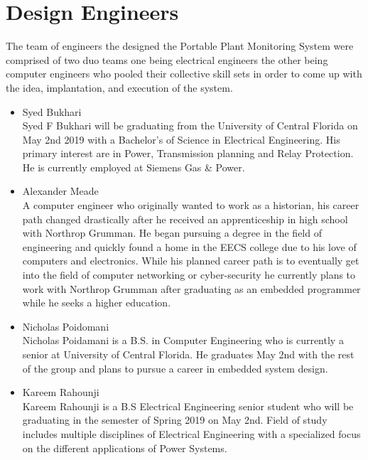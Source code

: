 \documentclass[comsoc, 12pt]{IEEEtran}
\begin{document}
\section{Design Engineers}
The team of engineers the designed the Portable Plant Monitoring System were comprised of two duo teams one being electrical engineers the other being computer engineers who pooled their collective skill sets in order to come up with the idea, implantation, and execution of the system. 
\begin{itemize}
    \item Syed Bukhari \\
    Syed F Bukhari will be graduating from the University of Central Florida on May 2nd 2019 with a Bachelor’s of Science in Electrical Engineering. His primary interest are in Power, Transmission planning and Relay Protection. He is currently employed at Siemens Gas & Power.
    \item Alexander Meade \\
    A computer engineer who originally wanted to work as a historian, his career path changed drastically after he received an apprenticeship in high school with Northrop Grumman. He began pursuing a degree in the field of engineering and quickly found a home in the EECS college due to his love of computers and electronics. While his planned career path is to eventually get into the field of computer networking or cyber-security he currently plans to work with Northrop Grumman after graduating as an embedded programmer while he seeks a higher education.  
    \item Nicholas Poidomani \\
    Nicholas Poidamani is a B.S. in Computer Engineering who is currently a senior at University of Central Florida. He graduates May 2nd with the rest of the group and plans to pursue a career in embedded system design.  
    \item Kareem Rahounji \\
    Kareem Rahounji is a B.S Electrical Engineering senior student who will be graduating in the semester of Spring 2019 on May 2nd. Field of study includes multiple disciplines of Electrical Engineering with a specialized focus on the different applications of Power Systems.
\end{itemize}



\end{document}
